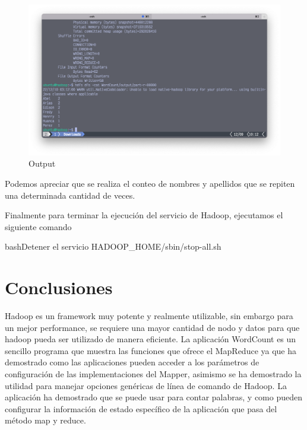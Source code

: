 \begin{figure}[h]
	\centering
	\includegraphics[scale=.28] {img/52-output-hdfs-dfs}
	\caption{Output}
	\label{fig:52}	
\end{figure} 

Podemos apreciar que se realiza el conteo de nombres y apellidos que se repiten una determinada cantidad de veces.

Finalmente para terminar la ejecución del servicio de Hadoop, ejecutamos el siguiente comando


\begin{sourcecode}[]{bash}{Detener el servicio}
HADOOP_HOME/sbin/stop-all.sh
\end{sourcecode}

\clearpage
\section{Conclusiones}

Hadoop es un framework muy potente y realmente utilizable, sin embargo para un mejor performance, se requiere una mayor cantidad de nodo y datos para que hadoop pueda ser utilizado de manera eficiente. La aplicación WordCount es un sencillo programa que muestra las funciones que ofrece el MapReduce ya que ha demostrado como las aplicaciones pueden acceder a los parámetros de configuración de las implementaciones del Mapper, asimismo se ha demostrado la utilidad para manejar opciones genéricas de línea de comando de Hadoop. La aplicación ha demostrado que se puede usar para contar palabras, y como pueden configurar la información de estado específico de la aplicación que pasa del método map y reduce. 
\clearpage
 